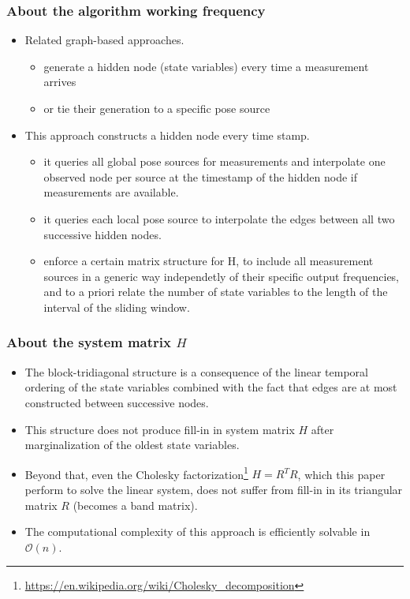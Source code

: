 \documentclass[letterpaper,10pt]{article}
\begin{document}
\subsubsection{About the algorithm working frequency}

\begin{itemize}
	\item Related graph-based approaches.
	\begin{itemize}
		\item generate a hidden node (state variables) every time a measurement arrives
		\item or tie their generation to a specific pose source
	\end{itemize}
	\item This approach constructs a hidden node every time stamp.
	\begin{itemize}
		\item it queries all global pose sources for measurements and interpolate one observed node per source at the timestamp of the hidden node if measurements are available.
		\item it queries each local pose source to interpolate the edges between all two successive hidden nodes.
		\item enforce a certain matrix structure for H, to include all measurement sources in a generic way independetly of their specific output frequencies, and to a priori relate the number of state variables to the length of the interval of the sliding window.
	\end{itemize}
\end{itemize}

\subsubsection{About the system matrix $H$}

\begin{itemize}
	\item The block-tridiagonal structure is a consequence of the linear temporal ordering of the state variables combined with the fact that edges are at most constructed between successive nodes.
	\item This structure does not produce fill-in in system matrix $H$ after marginalization of the oldest state variables.
	\item Beyond that, even the Cholesky factorization\footnote{\url{https://en.wikipedia.org/wiki/Cholesky_decomposition}} $H=R^TR$, which this paper perform to solve the linear system, does not suffer from fill-in in its triangular matrix $R$ (becomes a band matrix).
	\item The computational complexity of this approach is efficiently solvable in $\mathcal{O}(n)$.
\end{itemize}
\end{document}
